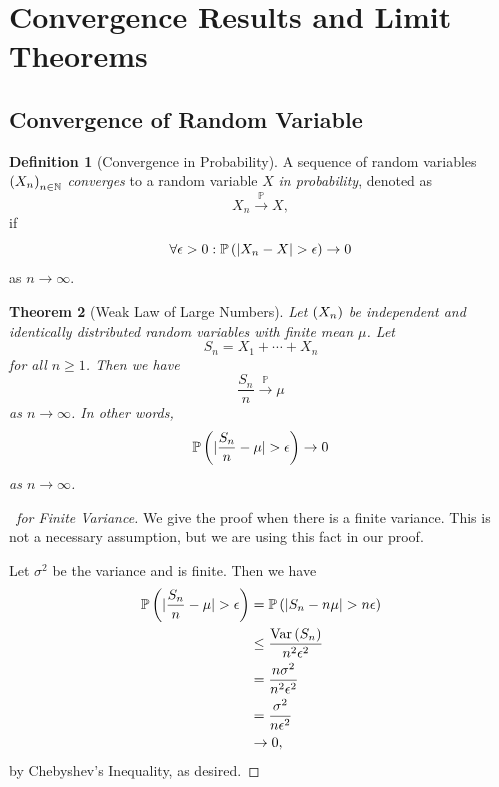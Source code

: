 \documentclass{article}
\newtheorem{theorem}{Theorem}[section]
\theoremstyle{definition}
\newtheorem{definition}[theorem]{Definition}
\theoremstyle{remark}
\DeclarePairedDelimiter{\abs}{\lvert}{\rvert}
\newcommand{\NN}{\mathbb{N}}
\newcommand{\Prob}{\mathbb{P}}
\newcommand{\toProb}{\xrightarrow{\mathbb P}}
\newcommand{\Var}{\operatorname{Var}}
\begin{document}
\section{Convergence Results and Limit Theorems}

\subsection{Convergence of Random Variable}

\begin{definition}[Convergence in Probability]
    \label{def:convergence-in-probability}%
    A sequence of random variables \(\pqty{X_n}_{n \in \NN}\) \emph{converges} to a random variable \(X\) \emph{in probability}, denoted as
    \[
        X_n \toProb X,
    \]
    if
    \[
        \forall \epsilon > 0: \Prob\pqty{\abs{X_n - X} > \epsilon} \to 0
    \]
    as \(n \to \infty\).
\end{definition}

\begin{theorem}[Weak Law of Large Numbers]
    \label{thm:weak-law-of-large-numbers}%
    Let \(\left(X_n\right)\) be independent and identically distributed random variables with finite mean \(\mu\). Let
    \[
        S_n = X_1 + \cdots + X_n
    \]
    for all \(n \geq 1\). Then we have
    \[
        \frac{S_n}{n} \toProb \mu
    \]
    as \(n \to \infty\). In other words,
    \[
        \Prob\pqty{\abs{\frac{S_n}{n} - \mu} > \epsilon} \to 0
    \]
    as \(n \to \infty\).
\end{theorem}

\begin{proof}[\proofname\ for Finite Variance]
    We give the proof when there is a finite variance. This is not a necessary assumption, but we are using this fact in our proof.

    Let \(\sigma^2\) be the variance and is finite. Then we have
    \begin{align*}
        \Prob\pqty{\abs{\frac{S_n}{n} - \mu} > \epsilon} &= \Prob\pqty{\abs{S_n - n \mu} > n \epsilon} \\
        &\leq \frac{\Var\pqty{S_n}}{n^2 \epsilon^2} \\
        &= \frac{n \sigma^2}{n^2 \epsilon^2} \\
        &= \frac{\sigma^2}{n \epsilon^2} \\
        &\to 0,
    \end{align*}
    by Chebyshev's Inequality, as desired.
\end{proof}
\end{document}
